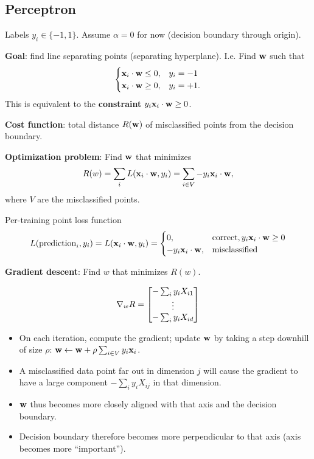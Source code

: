 \documentclass[12pt]{article}
\begin{document}
\subsection*{Perceptron}

Labels $y_i \in \{-1, 1\}$. Assume $\alpha=0$ for now (decision boundary through origin).

\textbf{Goal}: find line separating points (separating hyperplane). I.e. Find $\mathbf w$ such that
\begin{align*}
  \begin{cases}
    \mathbf x_i \cdot \mathbf w \leq 0, &y_i = -1 \\
    \mathbf x_i \cdot \mathbf w \geq 0, &y_i = +1.
  \end{cases}
\end{align*}
This is equivalent to the \textbf{constraint} $y_i\mathbf x_i \cdot \mathbf w \geq 0$.

\textbf{Cost function}: total distance $R(\mathbf w)$ of misclassified points from the
decision boundary.
\\
\begin{mdframed}
  \textbf{Optimization problem}: Find $\mathbf w$ that minimizes
  \begin{align*}
    R(w) = \sum_i L(\mathbf x_i \cdot \mathbf w, y_i) = \sum_{i \in V} -y_i\mathbf x_i \cdot \mathbf w,
  \end{align*}
  where $V$ are the misclassified points.
\end{mdframed}

Per-training point loss function
\begin{align*}
  L(\text{prediction}_i, y_i) = L(\mathbf x_i \cdot \mathbf w, y_i) =
  \begin{cases}
    0, &\text{correct}, y_i\mathbf x_i \cdot \mathbf w \geq 0\\
    -y_i\mathbf x_i \cdot \mathbf w, &\text{misclassified}
  \end{cases}
\end{align*}


\textbf{Gradient descent}: Find $w$ that minimizes $R(w)$.


\begin{align*}
  \nabla_w R = \begin{bmatrix}-\sum_i y_iX_{i1}\\\vdots\\-\sum_i y_iX_{id}\end{bmatrix}
\end{align*}
\begin{itemize}
\item On each iteration, compute the gradient; update $\mathbf w$ by taking a step
  downhill of size $\rho$: $\mathbf w \leftarrow \mathbf w + \rho \sum_{i \in V} y_i\mathbf x_i$.
\item A misclassified data point far out in dimension $j$ will cause the
  gradient to have a large component $-\sum_i y_iX_{ij}$ in that dimension.
\item $\mathbf w$ thus becomes more closely aligned with that axis and the decision
  boundary.
\item Decision boundary therefore becomes more perpendicular to that axis (axis
  becomes more ``important'').
\end{itemize}
\end{document}
